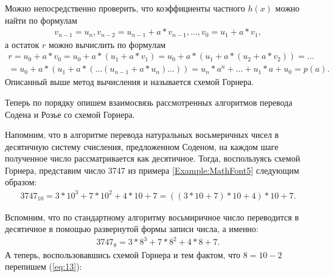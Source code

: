 \documentclass[14pt, russian]{scrartcl}
\begin{document}
Можно непосредственно проверить, что коэффициенты частного $h(x)$ можно найти по формулам 
\label{Example:MathFont10} 
\begin{equation*}\label{eq:10}
\begin{aligned}
v_{n-1} = u_n, v_{n-2} = u_{n-1} + a * v_{n-1}, ..., v_0 = u_1 + a* v_1, 
\end{aligned}
\end{equation*}
а остаток $r$ можно вычислить по формулам
\label{Example:MathFont11} 
\begin{equation*}\label{eq:11}
\begin{aligned}
r = u_0 + a*v_0 = u_0 + a*(u_1 + a*v_1) = u_0 + a*(u_1 + a*(u_2 + a*v_2)) = ... \\
= u_0 + a*(u_1+a*(...(u_{n-1}+a*u_n)...)) = u_n*a^n+...+u_1*a+u_0 = p(a).
\end{aligned}
\end{equation*}
Описанный выше метод вычисления и называется схемой Горнера.

Теперь по порядку опишем взаимосвязь рассмотренных алгоритмов перевода Содена и Розье со схемой Горнера. 

Напомним, что в алгоритме перевода натуральных восьмеричных чисел в десятичную систему счисления, предложенном Соденом, на каждом шаге полученное число рассматривается как десятичное. Тогда, воспользуясь схемой Горнера, представим число 3747 из примера \ref{Example:MathFont5} следующим образом:
\label{Example:MathFont12} 
\begin{equation*}\label{eq:12}
\begin{aligned}
3747_{10} = 3 * 10^3 + 7 * 10^2 + 4 * 10 + 7 = ((3 * 10 + 7)*10 + 4) * 10 + 7. 
\end{aligned}
\end{equation*}

Вспомним, что по стандартному алгоритму восьмиричное число переводится в десятичное в помощью развернутой формы записи числа, а именно:
\label{Example:MathFont13} 
\begin{equation}\label{eq:13}
\begin{aligned}
3747_8 = 3 * 8^3 + 7 * 8^2 + 4 * 8 + 7. 
\end{aligned}
\end{equation}
А теперь, воспользовавшись схемой Горнера и тем фактом, что $8=10-2$ перепишем (\ref{eq:13}):
\end{document}
